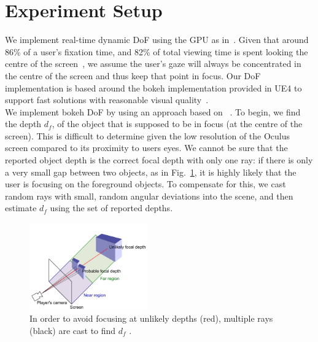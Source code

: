 \section{Experiment Setup}


We implement real-time dynamic DoF using the GPU as in~\cite{riguer04, duchowski14}. Given that around 86\% of a user's fixation time, and 82\% of total viewing time is spent looking the centre of the screen~\cite{kenney05}, we assume the user's gaze will always be concentrated in the centre of the screen and thus keep that point in focus. Our DoF implementation is based around the bokeh implementation provided in UE4 to support fast solutions with reasonable visual quality~\cite{ue4Bokeh}. \\

We implement bokeh DoF by using an approach based on ~\cite{riguer04}. To begin, we find the depth $d_f$, of the object that is supposed to be in focus (at the centre of the screen). This is difficult to determine given the low resolution of the Oculus screen compared to its proximity to users eyes. We cannot be sure that the reported object depth is the correct focal depth with only one ray: if there is only a very small gap between two objects, as in Fig.~\ref{fig:raycast}, it is highly likely that the user is focusing on the foreground objects. To compensate for this, we cast random rays with small, random angular deviations into the scene, and then estimate $d_f$ using the set of reported depths. 

\begin{figure}[h!]
       \centering
           \includegraphics[width=0.45\textwidth]{images/distanceCheck.png}
            \caption{In order to avoid focusing at unlikely depths (red), multiple rays (black) are cast to find $d_f$ .}
            \label{fig:raycast}
\end{figure}

